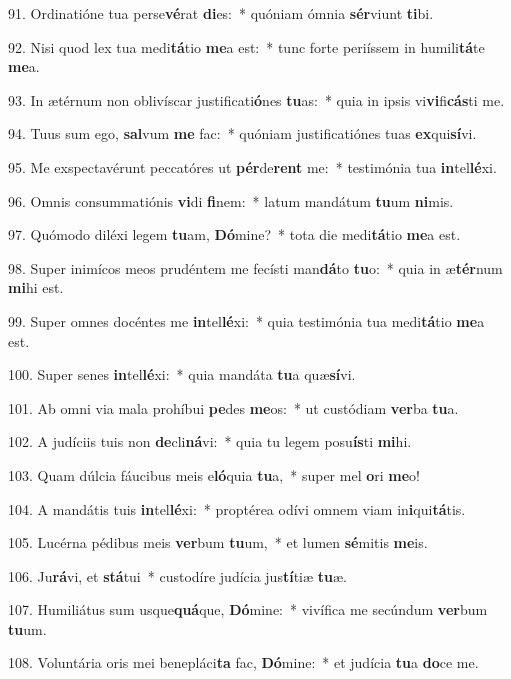 91. Ordinatióne tua perse\textbf{vé}rat \textbf{di}es:~*  quóniam ómnia \textbf{sér}viunt \textbf{ti}bi.\

92. Nisi quod lex tua medi\textbf{tá}tio \textbf{me}a est:~*  tunc forte periíssem in humili\textbf{tá}te \textbf{me}a.\

93. In ætérnum non oblivíscar justificati\textbf{ó}nes \textbf{tu}as:~*  quia in ipsis vi\textbf{vi}fi\textbf{cás}ti me.\

94. Tuus sum ego, \textbf{sal}vum \textbf{me} fac:~*  quóniam justificatiónes tuas \textbf{ex}qui\textbf{sí}vi.\

95. Me exspectavérunt peccatóres ut \textbf{pér}de\textbf{rent} me:~*  testimónia tua \textbf{in}tel\textbf{lé}xi.\

96. Omnis consummatiónis \textbf{vi}di \textbf{fi}nem:~*  latum mandátum \textbf{tu}um \textbf{ni}mis.\

97. Quómodo diléxi legem \textbf{tu}am, \textbf{Dó}mine?~*  tota die medi\textbf{tá}tio \textbf{me}a est.\

98. Super inimícos meos prudéntem me fecísti man\textbf{dá}to \textbf{tu}o:~*  quia in æ\textbf{tér}num \textbf{mi}hi est.\

99. Super omnes docéntes me \textbf{in}tel\textbf{lé}xi:~*  quia testimónia tua medi\textbf{tá}tio \textbf{me}a est.\

100. Super senes \textbf{in}tel\textbf{lé}xi:~*  quia mandáta \textbf{tu}a quæ\textbf{sí}vi.\

101. Ab omni via mala prohíbui \textbf{pe}des \textbf{me}os:~*  ut custódiam \textbf{ver}ba \textbf{tu}a.\

102. A judíciis tuis non \textbf{de}cli\textbf{ná}vi:~*  quia tu legem posu\textbf{ís}ti \textbf{mi}hi.\

103. Quam dúlcia fáucibus meis e\textbf{ló}quia \textbf{tu}a,~*  super mel \textbf{o}ri \textbf{me}o!\

104. A mandátis tuis \textbf{in}tel\textbf{lé}xi:~*  proptérea odívi omnem viam in\textbf{i}qui\textbf{tá}tis.\

105. Lucérna pédibus meis \textbf{ver}bum \textbf{tu}um,~*  et lumen \textbf{sé}mitis \textbf{me}is.\

106. Ju\textbf{rá}vi, et \textbf{stá}tui~*  custodíre judícia jus\textbf{tí}tiæ \textbf{tu}æ.\

107. Humiliátus sum usque\textbf{quá}que, \textbf{Dó}mine:~*  vivífica me secúndum \textbf{ver}bum \textbf{tu}um.\

108. Voluntária oris mei benepláci\textbf{ta} fac, \textbf{Dó}mine:~*  et judícia \textbf{tu}a \textbf{do}ce me.\

